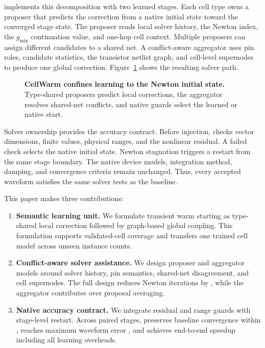 \system{} implements this decomposition with two learned stages. Each cell type owns a proposer that predicts the correction from a native initial state toward the converged stage state. The proposer reads local solver history, the Newton index, the $g_{\min}$ continuation value, and one-hop cell context. Multiple proposers can assign different candidates to a shared net. A conflict-aware aggregator uses pin roles, candidate statistics, the transistor netlist graph, and cell-level supernodes to produce one global correction. Figure~\ref{fig:overview} shows the resulting solver path.

\begin{figure}[t]
  \centering
  \resizebox{\columnwidth}{!}{}
  \caption{\textbf{CellWarm confines learning to the Newton initial state.} Type-shared proposers predict local corrections, the aggregator resolves shared-net conflicts, and native guards select the learned or native start.}
  \label{fig:overview}
\end{figure}

Solver ownership provides the accuracy contract. Before injection, \system{} checks vector dimensions, finite values, physical ranges, and the nonlinear residual. A failed check selects the native initial state. Newton stagnation triggers a restart from the same stage boundary. The native device models, integration method, damping, and convergence criteria remain unchanged. Thus, every accepted waveform satisfies the same solver tests as the baseline.

This paper makes three contributions:
\begin{enumerate}[leftmargin=*,itemsep=1pt,topsep=2pt]
  \item \textbf{Semantic learning unit.} We formulate transient warm starting as type-shared local correction followed by graph-based global coupling. This formulation supports \CoverageForty{} validated-cell coverage and transfers one trained cell model across unseen instance counts.
  \item \textbf{Conflict-aware solver assistance.} We design proposer and aggregator models around solver history, pin semantics, shared-net disagreement, and cell supernodes. The full design reduces Newton iterations by \NewtonReduction{}, while the aggregator contributes \MeanAggregatorGain{} over proposal averaging.
  \item \textbf{Native accuracy contract.} We integrate residual and range guards with stage-level restart. Across \NumTestStages{} paired stages, \system{} preserves baseline convergence within \ConvergenceDelta{}, reaches maximum waveform error \WaveformAbsError{}, and achieves \HeadlineSpeedup{} end-to-end speedup including all learning overheads.
\end{enumerate}

